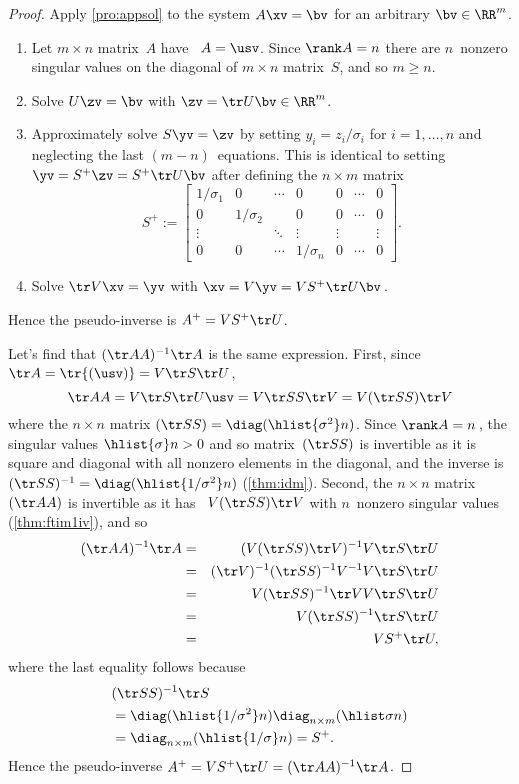 \begin{proof} 
Apply \cref{pro:appsol} to the system \(A\xv=\bv\) for an arbitrary \(\bv\in\RR^m\).
\begin{enumerate}
\item Let \(m\times n\) matrix~\(A\) have \svd\ \(A=\usv\).  
Since \(\rank A=n\) there are \(n\)~nonzero singular values on the diagonal of \(m\times n\) matrix~\(S\), and so \(m\geq n\).
\item Solve \(U\zv=\bv\) with \(\zv=\tr U\bv\in\RR^m\).
\item Approximately solve \(S\yv=\zv\) by setting \(y_i=z_i/\sigma_i\) for \(i=1,\ldots,n\) and neglecting the last \((m-n)\)~equations.
This is identical to setting \(\yv=S^+\zv=S^+\tr U\bv\) after defining the \(n\times m\) matrix
\begin{equation*}
S^+:=\begin{bmatrix} 1/\sigma_1&0&\cdots&0&0&\cdots&0
\\0&1/\sigma_2&&0&0&\cdots&0
\\\vdots&&\ddots&\vdots&\vdots&&\vdots
\\0&0&\cdots&1/\sigma_n&0&\cdots&0 \end{bmatrix}.
\end{equation*}
\item Solve \(\tr V\xv=\yv\) with \(\xv=V\yv=VS^+\tr U\bv\)\,.
\end{enumerate}
Hence the pseudo-inverse is \(A^+=VS^+\tr U\).

Let's find that \((\tr AA)^{-1}\tr A\) is the same expression.
First, since \(\tr A=\tr{(\usv)}=V\tr S\tr U\),
\begin{equation*}
\tr AA=V\tr S\tr U\usv=V\tr SS\tr V=V(\tr SS)\tr V
\end{equation*}
where the \(n\times n\) matrix \((\tr SS)=\diag(\hlist{\sigma^2}n)\).
Since \(\rank A=n\)\,, the singular values \(\hlist{\sigma}n>0\) and so matrix~\((\tr SS)\) is invertible as it is square and diagonal with all nonzero elements in the diagonal, and the inverse is \((\tr SS)^{-1}=\diag(\hlist{1/\sigma^2}n)\) (\cref{thm:idm}).
Second, the \(n\times n\) matrix \((\tr AA)\) is invertible as it has \svd\ \(V(\tr SS)\tr V\) with \(n\)~nonzero singular values (\cref{thm:ftim1iv}), and so
\begin{eqnarray*}
(\tr AA)^{-1}\tr A
&=&(V(\tr SS)\tr V)^{-1}V\tr S\tr U
\\&=&(\tr V)^{-1}(\tr SS)^{-1}V^{-1}V\tr S\tr U
\\&=&V(\tr SS)^{-1}\tr VV\tr S\tr U
\\&=&V(\tr SS)^{-1}\tr S\tr U
\\&=&VS^+\tr U,
\end{eqnarray*}
where the last equality follows because
\begin{align*}
&(\tr SS)^{-1}\tr S
\\&=\diag(\hlist{1/\sigma^2}n)\diag_{n\times m}(\hlist\sigma n)
\\&=\diag_{n\times m}(\hlist{1/\sigma}n)=S^+.
\end{align*}
Hence the pseudo-inverse \(A^+=VS^+\tr U=(\tr AA)^{-1}\tr A\).
\end{proof}





